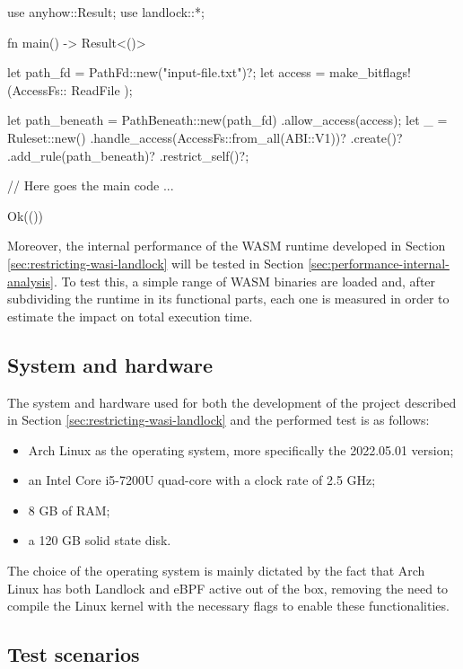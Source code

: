 \vspace*{0.5cm}
\begin{code}[language=Rust, caption=An example of a program restricted with Landlock., label=lst:test-program-landlock-example]
use anyhow::Result;
use landlock::*;

fn main() -> Result<()> {
    let path_fd = PathFd::new("input-file.txt")?;
    let access = make_bitflags!(AccessFs::{ ReadFile });
    
    let path_beneath = PathBeneath::new(path_fd)
      .allow_access(access);
    let _ = Ruleset::new()
        .handle_access(AccessFs::from_all(ABI::V1))?
        .create()?
        .add_rule(path_beneath)?
        .restrict_self()?;

    // Here goes the main code ...

    Ok(())
}
\end{code}

Moreover, the internal performance of the WASM runtime developed in Section \ref{sec:restricting-wasi-landlock}
will be tested in Section \ref{sec:performance-internal-analysis}. To test this, a simple range of WASM binaries
are loaded and, after subdividing the runtime in its functional parts, each one is measured in order
to estimate the impact on total execution time.

\subsection{System and hardware}

The system and hardware used for both the development of the project described in Section \ref{sec:restricting-wasi-landlock}
and the performed test is as follows:
\begin{itemize}
  \item Arch Linux \cite{arch-linux} as the operating system, more specifically the 2022.05.01 version;
  \item an Intel Core i5-7200U quad-core with a clock rate of 2.5 GHz;
  \item 8 GB of RAM;
  \item a 120 GB solid state disk.
\end{itemize}

The choice of the operating system is mainly dictated by the fact that Arch Linux has both Landlock and eBPF active
out of the box, removing the need to compile the Linux kernel with the necessary flags to enable these
functionalities.

\subsection{Test scenarios}
\label{sec:performance-test-description}

